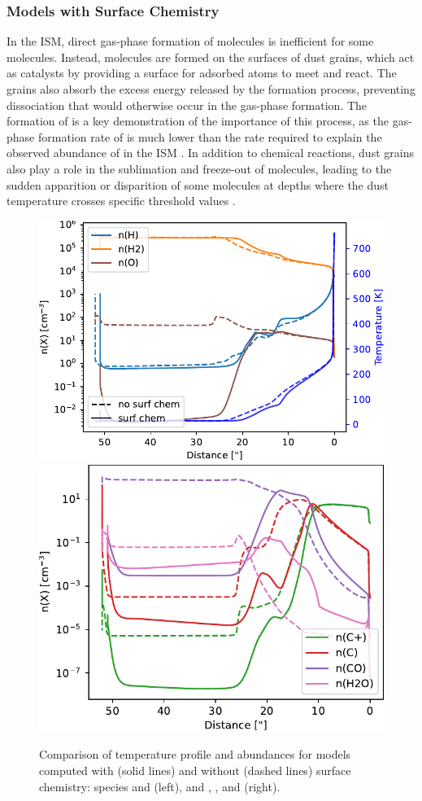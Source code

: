 \documentclass[12pt,a4paper]{article}
\newcommand{\qt}[1]{}
\begin{document}
\subsubsection{Models with Surface Chemistry} \label{sec:surfchem}
\qt{to consider Emeric's comment?}
In the ISM, direct gas-phase formation of molecules is inefficient for some molecules. Instead, molecules are formed on the surfaces of dust grains, which act as catalysts by providing a surface for adsorbed atoms to meet and react. The grains also absorb the excess energy released by the formation process, preventing dissociation that would otherwise occur in the gas-phase formation. The formation of  is a key demonstration of the importance of this process, as the gas-phase formation rate of  is much lower than the rate required to explain the observed abundance of  in the ISM \parencite{Gould1963,Hollenbach1971}. In addition to chemical reactions, dust grains also play a role in the sublimation and freeze-out of molecules, leading to the sudden apparition or disparition of some molecules at depths where the dust temperature crosses specific threshold values \parencite{Herbst2009}.

\begin{figure}[hb]
    \centering
    \includegraphics[width=.52\textwidth,keepaspectratio]{cmpsurfb_H_O.pdf}
    \includegraphics[width=.47\textwidth,keepaspectratio]{cmpsurfb_CO_H2O.pdf}
    \caption{Comparison of temperature profile and abundances for models computed with (solid lines) and without (dashed lines) surface chemistry:  species and  (left), and , , and  (right).} \label{fig:cmpsurfb}
\end{figure}
\end{document}
